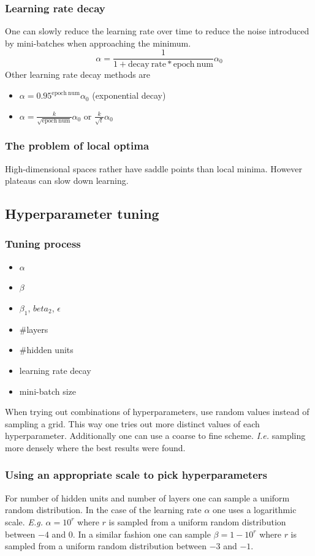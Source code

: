 \documentclass{article}
\begin{document}
\subsubsection{Learning rate decay}
One can slowly reduce the learning rate over time to reduce the noise introduced by mini-batches
when approaching the minimum.
\begin{equation}
  \alpha=\frac{1}{1+\mathrm{decay\ rate}*\mathrm{epoch\ num}}\alpha_0
\end{equation}
Other learning rate decay methods are
\begin{itemize}
  \item $\alpha=0.95^{\mathrm{epoch\ num}}\alpha_0$ (exponential decay)
  \item $\alpha=\frac{k}{\sqrt{\mathrm{epoch\ num}}}\alpha_0$ or $\frac{k}{\sqrt{t}}\alpha_0$
\end{itemize}

\subsubsection{The problem of local optima}
High-dimensional spaces rather have saddle points than local minima.
However plateaus can slow down learning.

\subsection{Hyperparameter tuning}
\subsubsection{Tuning process}
\begin{itemize}
  \item $\alpha$
  \item $\beta$
  \item $\beta_1$, $beta_2$, $\epsilon$
  \item \#layers
  \item \#hidden units
  \item learning rate decay
  \item mini-batch size
\end{itemize}
When trying out combinations of hyperparameters, use random values instead of sampling a grid.
This way one tries out more distinct values of each hyperparameter.
Additionally one can use a coarse to fine scheme. \emph{I.e.} sampling more densely where the best results were found.

\subsubsection{Using an appropriate scale to pick hyperparameters}
For number of hidden units and number of layers one can sample a uniform random distribution.
In the case of the learning rate $\alpha$ one uses a logarithmic scale.
\emph{E.g.} $\alpha=10^r$ where $r$ is sampled from a uniform random distribution between $-4$ and $0$.
In a similar fashion one can sample $\beta=1-10^r$ where $r$ is sampled from a uniform random distribution between $-3$ and $-1$.
\end{document}
